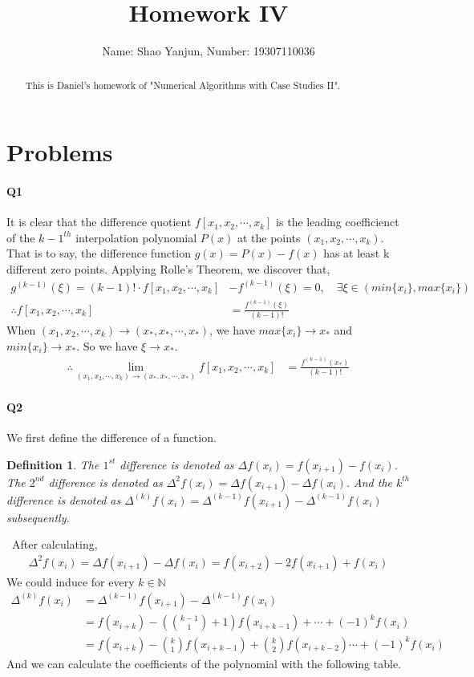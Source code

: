 \documentclass[11pt]{article}
\title{Homework IV}
\author{Name: Shao Yanjun, Number: 19307110036}
\newtheorem{definition}[theorem]{Definition}
\begin{document}
\maketitle

\begin{abstract}
This is Daniel's homework of  "Numerical Algorithms with Case Studies II".
\end{abstract}
\section{Problems}
\paragraph{Q1}
It is clear that the difference quotient $f[x_1,x_2,\cdots,x_k]$ is the leading coefficienct of the $k-1^{th}$ interpolation polynomial $P(x)$ at the points $(x_1,x_2,\cdots,x_k)$. That is to say, the difference function $g(x)=P(x)-f(x)$ has at least k different zero points. Applying Rolle's Theorem, we discover that,
\begin{align}
g^{(k-1)}(\xi)=(k-1)!\cdot f[x_1,x_2,\cdots,x_k]&-f^{(k-1)}(\xi)=0
,\quad\exists \xi\in(min\{x_i\},max\{x_i\})\\ \therefore
f[x_1,x_2,\cdots,x_k]&=\frac{f^{(k-1)}(\xi)}{(k-1)!}
\end{align}
\qquad When $(x_1,x_2,\cdots,x_k)\rightarrow(x_*,x_*,\cdots,x_*)$, we have $max\{x_i\}\rightarrow x_*$ and $min\{x_i\}\rightarrow x_*$. So we have $\xi\rightarrow x_*$.
\begin{align}
	\therefore \lim_{(x_1,x_2,\cdots,x_k)\rightarrow(x_*,x_*,\cdots,x_*)} f[x_1,x_2,\cdots,x_k]&=\frac{f^{(k-1)}(x_*)}{(k-1)!}
\end{align}
\paragraph{Q2}
We first define the difference of a function.
\begin{definition}
	The $1^{st}$ difference is denoted as $\Delta f(x_i)=f(x_{i+1})-f(x_i)$. 
	The $2^{nd}$ difference is denoted as $\Delta^2 f(x_i)=\Delta f(x_{i+1})-\Delta f(x_i)$. And the $k^{th}$ difference is denoted as $\Delta^{(k)}f(x_i)=\Delta^{(k-1)}f(x_{i+1})-
	\Delta^{(k-1)}f(x_i)$ subsequently.
\end{definition}
\, After calculating,
\begin{align}
	\Delta^2 f(x_i)=\Delta f(x_{i+1})-\Delta f(x_i)=f(x_{i+2})-2f(x_{i+1})+f(x_i)
\end{align} 
\qquad We could induce for every $k\in \mathbb{N}$
\begin{align}
	\Delta^{(k)}f(x_i)&=\Delta^{(k-1)}f(x_{i+1})-
	\Delta^{(k-1)}f(x_i)\\&=f(x_{i+k})-(\binom{k-1}{1}+1)f(x_{i+k-1})+\cdots+(-1)^k f(x_i)\\
	&=f(x_{i+k})-\binom{k}{1}f(x_{i+k-1})+\binom{k}{2}f(x_{i+k-2})\cdots+(-1)^k f(x_i)
\end{align}
\qquad And we can calculate the coefficients of the polynomial with the following table.\\
\end{document}
